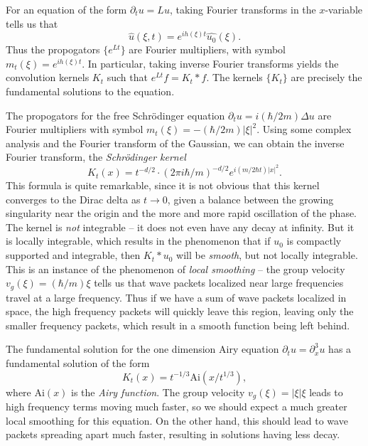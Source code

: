 For an equation of the form $\partial_t u = Lu$, taking Fourier transforms in the $x$-variable tells us that
%
\[ \widehat{u}(\xi,t) = e^{i h(\xi) t} \widehat{u_0}(\xi). \]
%
Thus the propogators $\{ e^{Lt} \}$ are Fourier multipliers, with symbol $m_t(\xi) = e^{i h(\xi) t}$. In particular, taking inverse Fourier transforms yields the convolution kernels $K_t$ such that $e^{Lt} f = K_t * f$. The kernels $\{ K_t \}$ are precisely the fundamental solutions to the equation.

\begin{example}
	The propogators for the free Schr\"{o}dinger equation $\partial_t u = i (\hbar / 2 m) \Delta u$ are Fourier multipliers with symbol $m_t(\xi) = - (\hbar / 2m) |\xi|^2$. Using some complex analysis and the Fourier transform of the Gaussian, we can obtain the inverse Fourier transform, the \emph{Schr\"{o}dinger kernel}
	\[ K_t(x) = t^{-d/2} \cdot (2 \pi i \hbar / m)^{-d/2} e^{i (m / 2 \hbar t) |x|^2}. \]
	This formula is quite remarkable, since it is not obvious that this kernel converges to the Dirac delta as $t \to 0$, given a balance between the growing singularity near the origin and the more and more rapid oscillation of the phase. The kernel is \emph{not} integrable -- it does not even have any decay at infinity. But it is locally integrable, which results in the phenomenon that if $u_0$ is compactly supported and integrable, then $K_t * u_0$ will be \emph{smooth}, but not locally integrable. This is an instance of the phenomenon of \emph{local smoothing} -- the group velocity $v_g(\xi) = (\hbar / m) \xi$ tells us that wave packets localized near large frequencies travel at a large frequency. Thus if we have a sum of wave packets localized in space, the high frequency packets will quickly leave this region, leaving only the smaller frequency packets, which result in a smooth function being left behind.
\end{example}

\begin{example}
	The fundamental solution for the one dimension Airy equation $\partial_t u = \partial_x^3 u$ has a fundamental solution of the form
	\[ K_t(x) = t^{-1/3} \text{Ai}( x / t^{1/3} ), \]
	where $\text{Ai}(x)$ is the \emph{Airy function}. The group velocity $v_g(\xi) = |\xi| \xi$ leads to high frequency terms moving much faster, so we should expect a much greater local smoothing for this equation. On the other hand, this should lead to wave packets spreading apart much faster, resulting in solutions having less decay.
\end{example}


